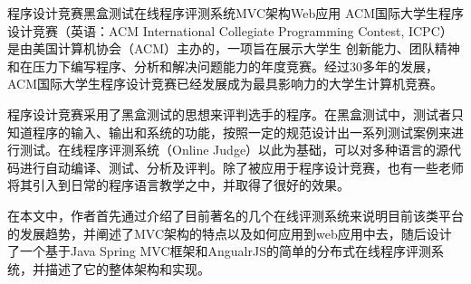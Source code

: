 
\begin{Cabstract}{程序设计竞赛}{黑盒测试}{在线程序评测系统}{MVC架构}{Web应用}
ACM国际大学生程序设计竞赛（英语：ACM International Collegiate Programming Contest, ICPC）是由美国计算机协会（ACM）主办的，一项旨在展示大学生 创新能力、团队精神和在压力下编写程序、分析和解决问题能力的年度竞赛。经过30多年的发展，ACM国际大学生程序设计竞赛已经发展成为最具影响力的大学生计算机竞赛。

程序设计竞赛采用了黑盒测试的思想来评判选手的程序。在黑盒测试中，测试者只知道程序的输入、输出和系统的功能，按照一定的规范设计出一系列测试案例来进行测试。在线程序评测系统（Online Judge）以此为基础，可以对多种语言的源代码进行自动编译、测试、分析及评判。除了被应用于程序设计竞赛，也有一些老师将其引入到日常的程序语言教学之中，并取得了很好的效果。

在本文中，作者首先通过介绍了目前著名的几个在线评测系统来说明目前该类平台的发展趋势，并阐述了MVC架构的特点以及如何应用到web应用中去，随后设计了一个基于Java Spring MVC框架和AngualrJS的简单的分布式在线程序评测系统，并描述了它的整体架构和实现。
\end{Cabstract}
